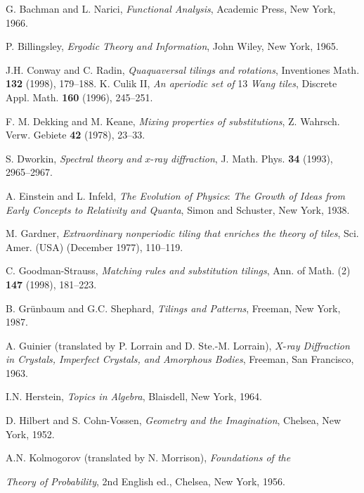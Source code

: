 \documentclass[reqno]{stml-l}
\theoremstyle{plain}
\theoremstyle{definition}
\numberwithin{equation}{chapter}
\begin{document}
\backmatter

\def\bibname{References}

\begin{thebibliography}{99}
 G. Bachman and L. Narici, \emph{Functional Analysis}, Academic Press, New York, 1966.

 P. Billingsley, \emph{Ergodic Theory and Information}, John Wiley, New York, 1965.

 J.H. Conway and C. Radin, \emph{Quaquaversal tilings and rotations}, Inventiones Math. \textbf{132} (1998), 179--188.
 K. Culik II, \emph{An aperiodic set of} 13 \emph{Wang tiles}, Discrete Appl. Math. \textbf{160} (1996), 245--251.

 F. M. Dekking and M. Keane, \emph{Mixing properties of substitutions}, Z. Wahrsch. Verw. Gebiete \textbf{42} (1978), 23--33.

 S. Dworkin, \emph{Spectral theory and} $x$-\emph{ray diffraction}, J. Math. Phys. \textbf{34} (1993), 2965--2967.

 A. Einstein and L. Infeld, \emph{The Evolution of Physics}: \emph{The Growth of Ideas from Early Concepts to Relativity and Quanta}, Simon and Schuster, New York, 1938.

 M. Gardner, \emph{Extraordinary nonperiodic tiling that enriches the theory of tiles}, Sci. Amer. (USA) (December 1977), 110--119.

 C. Goodman-Strauss, \emph{Matching rules and substitution tilings}, Ann. of Math. (2) \textbf{147} (1998), 181--223.

 B. Gr\"{u}nbaum and G.C. Shephard, \emph{Tilings and Patterns}, Freeman, New York, 1987.

 A. Guinier (translated by P. Lorrain and D. Ste.-M. Lorrain), $X$-\emph{ray Diffraction in Crystals, Imperfect Crystals, and Amorphous Bodies}, Freeman, San Francisco, 1963.

 I.N. Herstein, \emph{Topics in Algebra}, Blaisdell, New York, 1964.

 D. Hilbert and S. Cohn-Vossen, \emph{Geometry and the Imagination}, Chelsea, New York, 1952.

 A.N. Kolmogorov (translated by N. Morrison), \emph{Foundations of the}

\emph{Theory of Probability}, 2nd English ed., Chelsea, New York, 1956.


\end{thebibliography}
\end{document}
